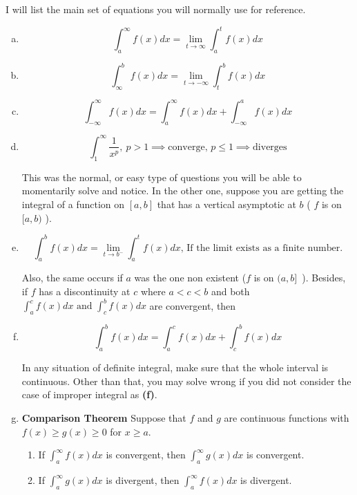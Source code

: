\documentclass{article}
\begin{document}
	I will list the main set of equations you will normally use for reference.

	\begin{enumerate}[a.]
		\item $$\int^{\infty}_{a} f(x) dx = \lim_{t \to \infty} \int^{t}_{a} f(x) dx   $$
		\item $$\int^{b}_{\infty} f(x) dx = \lim_{t \to -\infty} \int^{b}_{t} f(x) dx  $$
		\item 
			$$ \int^{\infty}_{-\infty} f(x) dx =
			\int^{\infty}_{a} f(x) dx + \int^{a}_{-\infty} f(x) dx 
			$$
		\item $$ \int^{\infty}_{1} \frac{1}{x^p} ,\ p>1 \implies \text{converge, } p 	\leq 1 \implies \text{diverges} $$


			This was the normal, or easy type of questions you will be able to momentarily solve and notice. In the other one, suppose you are getting the integral of a function on $ [a,b] $ that has a vertical asymptotic at $ b $ ( $ f $ is on $[a,b)$ ). 

		\item $$ \int^{b}_{a} f(x) dx = \lim_{t 	\to b^-	} \int^{t}_{a} f(x) dx \text{,  If the limit exists as a finite number.}  $$

			Also, the same occurs if $ a $ was the one non existent ($f$ is on $ (a,b]$\ ). Besides, if $ f $ has a discontinuity at $ c $ where $ a<c<b $ and both $ \int^{c}_{a} f(x) dx \text{ and } \int^{b}_{c} f(x) dx   $ are convergent, then 
		\item \[
				\int^{b}_{a} f(x) dx =
				\int^{c}_{a} f(x) dx + \int^{b}_{c} f(x) dx 
			\]

			In any situation of definite integral, make sure that the whole interval is continuous. Other than that, you may solve wrong if you did not consider the case of improper integral as \textbf{(f)}.

		\item \textbf{Comparison Theorem}  
			Suppose that $f$ and $g$ are continuous functions with $f(x) 	\geq g(x) 	\geq  0$ for $x \geq  a$.
			\begin{enumerate}[1.]
				\item If $\int^{\infty}_{a} f(x) dx$  is convergent, then $ \int^{\infty}_{a} g(x) dx   $  is convergent.
				\item
					If $\int^{\infty}_{a} g(x) dx$  is divergent, then $ \int^{\infty}_{a} f(x) dx   $  is divergent.
			\end{enumerate}
	\end{enumerate}
\end{document}
